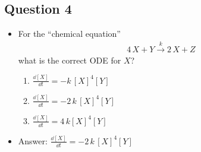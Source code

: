 
\begin{slide}
\section{Question 4}

\begin{PauseHighLight}
  \begin{itemize}
  \item For the ``chemical equation''
    \begin{align*}
      4\,X + Y \stackrel{k}{\longrightarrow} 2\,X + Z
    \end{align*}
    what is the correct ODE for $X$?
    \begin{enumerate}\setlength\itemsep{0.5em}
    \item $\frac{\dd [X]}{\dd t} = -k\,[X]^4 [Y]$
    \item $\frac{\dd [X]}{\dd t} = -2\, k\,[X]^4 [Y]$
    \item $\frac{\dd [X]}{\dd t} = 4\,k [X]^4 [Y]$\pause
    \end{enumerate}
    \item Answer: $\frac{\dd [X]}{\dd t} = -2\, k\,[X]^4 [Y]$\pauseb
  \end{itemize}
\end{PauseHighLight}

\end{slide}

